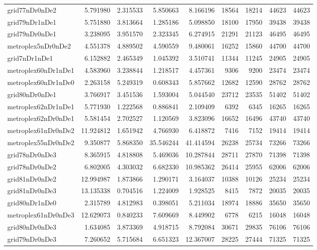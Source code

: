 \begin{longtable}{|l|r|r|r|r|r|r|r|r|}
grid77nDr0nDe2 & 5.791980 & 2.315533 & 5.850663 & 8.166196 & 18564 & 18214 & 44623 & 44623 \\
grid79nDr1nDe1 & 5.751880 & 3.813664 & 1.285186 & 5.098850 & 18100 & 17950 & 39438 & 39438 \\
grid79nDr0nDe1 & 3.238095 & 3.951570 & 2.323345 & 6.274915 & 21291 & 21123 & 46495 & 46495 \\
metroplex5nDr0nDe2 & 4.551378 & 4.889502 & 4.590559 & 9.480061 & 16252 & 15860 & 44700 & 44700 \\
grid7nDr1nDe1 & 6.152882 & 2.465349 & 1.045392 & 3.510741 & 11344 & 11245 & 24905 & 24905 \\
metroplex60nDr1nDe1 & 4.583960 & 3.238844 & 1.218517 & 4.457361 & 9306 & 9200 & 23474 & 23474 \\
metroplex60nDr1nDe0 & 2.263158 & 5.249319 & 0.608343 & 5.857662 & 12682 & 12590 & 28762 & 28762 \\
grid80nDr0nDe1 & 3.766917 & 3.451536 & 1.593004 & 5.044540 & 23712 & 23535 & 51402 & 51402 \\
metroplex62nDr1nDe1 & 5.771930 & 1.222568 & 0.886841 & 2.109409 & 6392 & 6345 & 16265 & 16265 \\
metroplex62nDr0nDe1 & 5.581454 & 2.702527 & 1.120569 & 3.823096 & 16652 & 16496 & 43740 & 43740 \\
metroplex61nDr0nDe2 & 11.924812 & 1.651942 & 4.766930 & 6.418872 & 7416 & 7152 & 19414 & 19414 \\
metroplex55nDr0nDe2 & 9.350877 & 5.868350 & 35.546244 & 41.414594 & 26238 & 25734 & 73266 & 73266 \\
grid78nDr0nDe3 & 8.365915 & 4.818808 & 5.469036 & 10.287844 & 28711 & 27870 & 71398 & 71398 \\
grid78nDr0nDe2 & 6.802005 & 4.303032 & 6.682330 & 10.985362 & 26414 & 25955 & 62006 & 62006 \\
grid81nDr0nDe2 & 12.994987 & 1.873866 & 1.290171 & 3.164037 & 10388 & 10126 & 25234 & 25234 \\
grid81nDr0nDe3 & 13.135338 & 0.704516 & 1.224009 & 1.928525 & 8415 & 7872 & 20035 & 20035 \\
grid80nDr1nDe0 & 2.315789 & 4.812983 & 0.398051 & 5.211034 & 18974 & 18886 & 35650 & 35650 \\
metroplex61nDr0nDe3 & 12.629073 & 0.840233 & 7.609669 & 8.449902 & 6778 & 6215 & 16048 & 16048 \\
grid80nDr0nDe3 & 1.634085 & 3.873369 & 4.918715 & 8.792084 & 30671 & 29835 & 76106 & 76106 \\
grid79nDr0nDe3 & 7.260652 & 5.715684 & 6.651323 & 12.367007 & 28225 & 27444 & 71325 & 71325 \\

\end{longtable}
